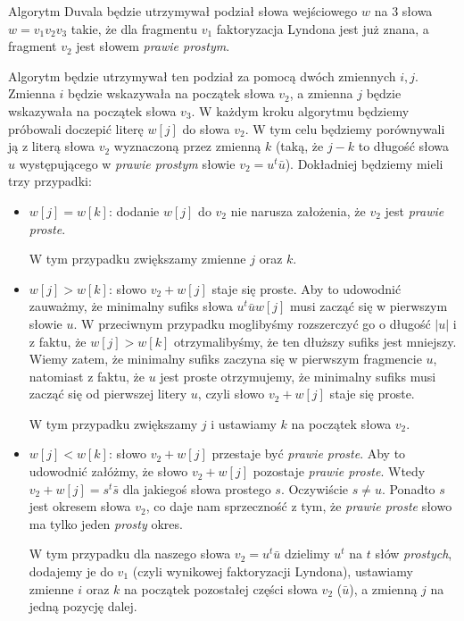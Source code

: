 \documentclass{article}
\begin{document}
Algorytm Duvala będzie utrzymywał podział słowa wejściowego $w$ na $3$ słowa $w=v_1v_2v_3$ takie, że dla fragmentu $v_1$ faktoryzacja Lyndona jest już znana, 
a fragment $v_2$ jest słowem \textit{prawie prostym}. 

Algorytm będzie utrzymywał ten podział za pomocą dwóch zmiennych $i, j$. Zmienna $i$ będzie wskazywała na początek słowa $v_2$, a zmienna $j$ będzie wskazywała na początek słowa $v_3$. 
W każdym kroku algorytmu będziemy próbowali doczepić literę $w[j]$ do słowa $v_2$. W tym celu będziemy porównywali ją z literą słowa $v_2$ wyznaczoną przez zmienną $k$ (taką, że $j - k$ 
to długość słowa $u$ występującego w \textit{prawie prostym} słowie $v_2 = u^t\bar{u}$). 
Dokładniej będziemy mieli trzy przypadki:
\begin{itemize}
    \item $w[j] = w[k]$: dodanie $w[j]$ do $v_2$ nie narusza założenia, że $v_2$ jest \textit{prawie proste}. 
    
    W tym przypadku zwiększamy zmienne $j$ oraz $k$.
    \item $w[j] > w[k]$: słowo $v_2 + w[j]$ staje się proste. 
    Aby to udowodnić zauważmy, że minimalny sufiks słowa $u^t\bar{u}w[j]$ musi zacząć się w pierwszym słowie $u$. 
    W przeciwnym przypadku moglibyśmy rozszerczyć go o długość $|u|$ i z faktu, że $w[j] > w[k]$ otrzymalibyśmy, że ten
    dłuższy sufiks jest mniejszy. Wiemy zatem, że minimalny sufiks zaczyna się w pierwszym fragmencie $u$, 
    natomiast z faktu, że $u$ jest proste otrzymujemy, że minimalny sufiks musi zacząć się od pierwszej litery $u$, 
    czyli słowo $v_2 + w[j]$ staje się proste.

    W tym przypadku zwiększamy $j$ i ustawiamy $k$ na początek słowa $v_2$.
    \item $w[j] < w[k]$: słowo $v_2 + w[j]$ przestaje być \textit{prawie proste}.
    Aby to udowodnić załóżmy, że słowo $v_2 + w[j]$ pozostaje \textit{prawie proste}. 
    Wtedy $v_2 + w[j] = s^t\bar{s}$ dla jakiegoś słowa prostego $s$. Oczywiście $s \neq u$.
    Ponadto $s$ jest okresem słowa $v_2$, co daje nam sprzeczność z tym, że \textit{prawie proste}
    słowo ma tylko jeden \textit{prosty} okres.
    
    W tym przypadku dla naszego słowa $v_2 = u^t\bar{u}$ dzielimy $u^t$ na $t$ słów \textit{prostych},
    dodajemy je do $v_1$ (czyli wynikowej faktoryzacji Lyndona), ustawiamy zmienne $i$ oraz $k$ na początek pozostałej części słowa $v_2$ ($\bar{u}$), a zmienną $j$ na jedną pozycję dalej.
\end{itemize}
\end{document}
